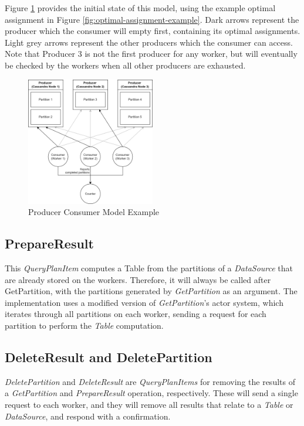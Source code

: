 Figure \ref{fig:producer-consumer-model-example} provides the initial state of this model, using the example optimal assignment in Figure \ref{fig:optimal-assignment-example}. Dark arrows represent the producer which the consumer will empty first, containing its optimal assignments. Light grey arrows represent the other producers which the consumer can access. Note that Producer 3 is not the first producer for any worker, but will eventually be checked by the workers when all other producers are exhausted.

\begin{figure}[h]
	\centering
	\includegraphics[width=0.5\textwidth]{chapters/diagrams/implementation/producer-consumer-model-example}
	\caption{Producer Consumer Model Example}
	\label{fig:producer-consumer-model-example}
\end{figure}

\subsection{PrepareResult}
This \textit{QueryPlanItem} computes a Table from the partitions of a \textit{DataSource} that are already stored on the workers. Therefore, it will always be called after GetPartition, with the partitions generated by \textit{GetPartition} as an argument. The implementation uses a modified version of \textit{GetPartition}'s actor system, which iterates through all partitions on each worker, sending a request for each partition to perform the \textit{Table} computation.

\subsection{DeleteResult and DeletePartition}

\textit{DeletePartition} and \textit{DeleteResult} are \textit{QueryPlanItems} for removing the results of a \textit{GetPartition} and \textit{PrepareResult} operation, respectively. These will send a single request to each worker, and they will remove all results that relate to a \textit{Table} or \textit{DataSource}, and respond with a confirmation.

